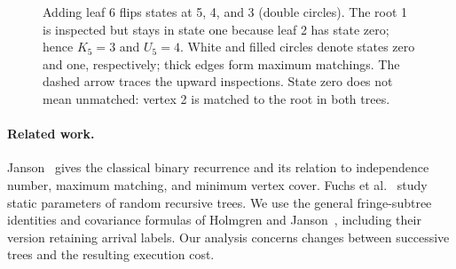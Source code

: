 \documentclass[runningheads,envcountsame,orivec]{llncs}
\begin{document}
\begin{figure}[t]
\centering
{}
\caption{Adding leaf 6 flips states at 5, 4, and 3 (double circles).
The root 1 is inspected but stays in state one because leaf 2 has state
zero; hence $K_5=3$ and $U_5=4$. White and filled circles denote states
zero and one, respectively; thick edges form maximum matchings.
The dashed arrow traces the upward inspections. State zero does not
mean unmatched: vertex 2 is matched to the root in both trees.}
\label{fig:propagation}
\end{figure}

\paragraph{Related work.}
Janson~\cite{Janson2020} gives the classical binary recurrence and its
relation to independence number, maximum matching, and minimum vertex
cover. Fuchs et al.\ \cite{Fuchs2020} study static parameters of random
recursive trees. We use the general fringe-subtree identities and
covariance formulas of Holmgren and Janson~\cite{HolmgrenJanson2015},
including their version retaining arrival labels. Our analysis concerns
changes between successive trees and the resulting execution cost.
\end{document}
